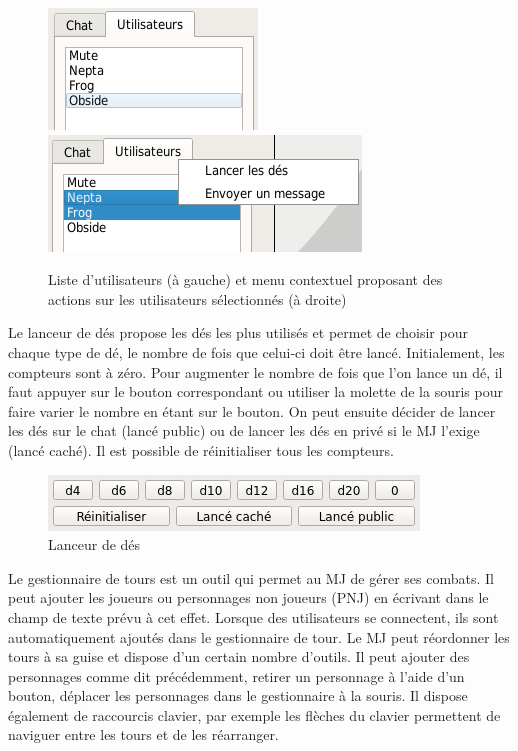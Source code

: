 \documentclass[11pt]{article}
\begin{document}
\begin{figure}[h!]
	\centering
	\includegraphics[scale=0.5]{img/chat_userlist_1.png}
	\hspace{10 mm}
	\includegraphics[scale=0.5]{img/chat_userlist_2.png}
	\caption{Liste d'utilisateurs (à gauche) et menu contextuel proposant des actions sur les utilisateurs sélectionnés (à droite)}
\end{figure}

Le lanceur de dés propose les dés les plus utilisés et permet de choisir pour chaque type de dé, le nombre de fois que celui-ci doit être lancé. Initialement, les compteurs sont à zéro. Pour augmenter le nombre de fois que l'on lance un dé, il faut appuyer sur le bouton correspondant ou utiliser la molette de la souris pour faire varier le nombre en étant sur le bouton. On peut ensuite décider de lancer les dés sur le chat (lancé public) ou de lancer les dés en privé si le MJ l'exige (lancé caché). Il est possible de réinitialiser tous les compteurs.

\begin{figure}[h!]
	\centering
	\includegraphics[scale=0.5]{img/dice_manager.jpg}
	\caption{Lanceur de dés}
\end{figure}

Le gestionnaire de tours est un outil qui permet au MJ de gérer ses combats. Il peut ajouter les joueurs ou personnages non joueurs (PNJ) en écrivant dans le champ de texte prévu à cet effet. Lorsque des utilisateurs se connectent, ils sont automatiquement ajoutés dans le gestionnaire de tour. Le MJ peut réordonner les tours à sa guise et dispose d'un certain nombre d'outils. Il peut ajouter des personnages comme dit précédemment, retirer un personnage à l'aide d'un bouton, déplacer les personnages dans le gestionnaire à la souris. Il dispose également de raccourcis clavier, par exemple les flèches du clavier permettent de naviguer entre les tours et de les réarranger.
\end{document}
